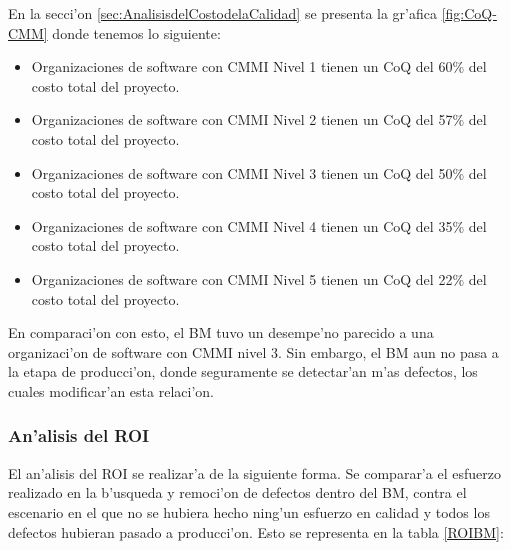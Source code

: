 En la secci'on \ref{sec:AnalisisdelCostodelaCalidad} se presenta la gr'afica \ref{fig:CoQ-CMM} donde tenemos lo siguiente:

\begin{itemize}
	\item Organizaciones de software con CMMI Nivel 1 tienen un CoQ del 60\% del costo total del proyecto.
	\item Organizaciones de software con CMMI Nivel 2 tienen un CoQ del 57\% del costo total del proyecto.
	\item Organizaciones de software con CMMI Nivel 3 tienen un CoQ del 50\% del costo total del proyecto.
	\item Organizaciones de software con CMMI Nivel 4 tienen un CoQ del 35\% del costo total del proyecto.
	\item Organizaciones de software con CMMI Nivel 5 tienen un CoQ del 22\% del costo total del proyecto.
\end{itemize}

En comparaci'on con esto, el BM tuvo un desempe'no parecido a una organizaci'on de software con CMMI nivel 3. Sin embargo, el BM aun no pasa a la etapa de producci'on, donde seguramente se detectar'an m'as defectos, los cuales modificar'an esta relaci'on.

\subsubsection{An'alisis del ROI}
\label{AnalisisdelROI}
\noindent
El an'alisis del ROI se realizar'a de la siguiente forma. Se comparar'a el esfuerzo realizado en la b'usqueda y remoci'on de defectos dentro del BM, contra el escenario en el que no se hubiera hecho ning'un esfuerzo en calidad y todos los defectos hubieran pasado a producci'on. Esto se representa en la tabla \ref{ROIBM}:

